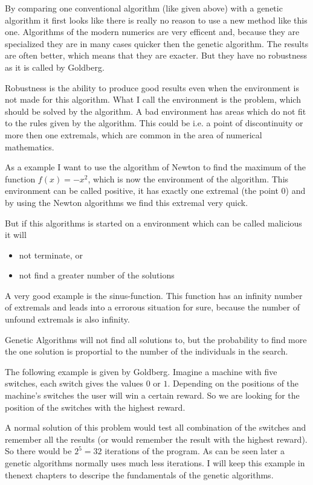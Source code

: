 By comparing one conventional algorithm (like given above) with a genetic algorithm
it first looks like there is really no reason to use a new method like this one.
Algorithms of the modern numerics are very efficent and, because they are specialized
they are in many cases quicker then the genetic algorithm. The results are often
better, which means that they are exacter. But they have no robustness as it is
called by Goldberg\cite{Gol89}.

Robustness is the ability to produce good results even when the environment is
not made for this algorithm. What I call the environment is the problem, which
should be solved by the algorithm. A bad environment has areas which do not
fit to the rules given by the algorithm. This could be i.e. a point of discontinuity
or more then one extremals, which are common in the area of numerical mathematics.

As a example I want to use the algorithm of Newton to find the maximum of the
function $f(x) = -x^2$, which is now the environment of the algorithm. This
environment can be called positive, it has exactly one extremal (the point $0$)
and by using the Newton algorithms we find this extremal very quick.

But if this algorithms is started on a environment which can be called malicious
it will
  \begin{itemize}
  \item not terminate, or
  \item not find a greater number of the solutions
  \end{itemize}
A very good example is the sinus-function. This function has an infinity number
of extremals and leads into a errorous situation for sure, because the number
of unfound extremals is also infinity.

Genetic Algorithms will not find all solutions to, but the probability to find
more the one solution is proportial to the number of the individuals in the search.

The following example is given by Goldberg\cite{Gol89}. Imagine a machine with five
switches, each switch gives the values $0$ or $1$. Depending on the positions
of the machine's switches the user will win a certain reward. So we are looking
for the position of the switches with the highest reward.

A normal solution of this problem would test all combination of the switches
and remember all the results (or would remember the result with the highest
reward). So there would be $2^5 = 32$ iterations of the program. As can be seen
later a genetic algorithms normally uses much less iterations. I will keep
this example in thenext chapters to descripe the fundamentals of the genetic
algorithms.

